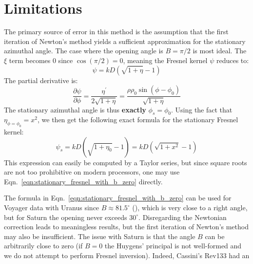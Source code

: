 \documentclass{article}
\theoremstyle{plain}
\begin{document}
    \section{Limitations}
        The primary source of error in this method is the assumption that
        the first iteration of Newton's method yields a sufficient
        approximation for the stationary azimuthal angle. The case where the
        opening angle is $B=\pi/2$ is most ideal.
        The $\xi$ term becomes $0$ since $\cos(\pi/2)=0$, meaning the
        Fresnel kernel $\psi$ reduces to:
        \begin{equation}
            \psi=kD\left(
                \sqrt{1+\eta}-1
            \right)
        \end{equation}
        The partial derivative is:
        \begin{equation}
            \frac{\partial\psi}{\partial\phi}
            =\frac{\eta^{\prime}}{2\sqrt{1+\eta}}
            =\frac{\rho\rho_{0}\sin(\phi-\phi_{0})}{\sqrt{1+\eta}}
        \end{equation}
        The stationary azimuthal angle is thus \textbf{exactly}
        $\phi_{s}=\phi_{0}$. Using the fact that $\eta_{\phi=\phi_{0}}=x^{2}$,
        we then get the following exact formula for the stationary Fresnel
        kernel:
        \begin{equation}
            \label{eqn:stationary_fresnel_with_b_zero}
            \psi_{s}
            =kD\left(
                \sqrt{1+\eta_{0}}-1
            \right)
            =kD(\sqrt{1+x^{2}}-1)
        \end{equation}
        This expression can easily be computed by a Taylor series, but since
        square roots are not too prohibitive on modern processors, one may
        use Eqn.~\ref{eqn:stationary_fresnel_with_b_zero} directly.
        \par\hfill\par
        The formula in Eqn.~\ref{eqn:stationary_fresnel_with_b_zero} can be
        used for Voyager data with Uranus since $B\approx{81.5}^{\circ}$
        (\cite[p.~133]{GreshVoyager1988}), which is very close to a right angle,
        but for Saturn the opening never exceeds $30^{\circ}$.
        Disregarding the Newtonian correction leads to meaningless results, but
        the first iteration of Newton's method may also be insufficient. The
        issue with Saturn is that the angle $B$ can be arbitrarily close to
        zero (if $B=0$ the Huygens' principal is not well-formed and we do not
        attempt to perform Fresnel inversion). Indeed, Cassini's Rev133 had an
\end{document}
